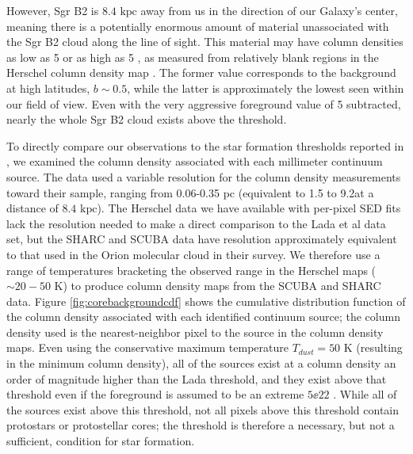 \documentclass[twocolumn]{aastex61}
\newcommand{\dsgrb}{\ensuremath{8.4\textrm{~kpc}}\xspace}
\begin{document}
However, Sgr B2 is \dsgrb away from us in the direction of our Galaxy's
center, meaning there is a potentially enormous amount of material unassociated
with the Sgr B2 cloud along the line of sight.  This material may have column
densities as low as
5 \persc or as high as 5 \persc, as measured from relatively
blank regions in the Herschel column density map \citep{Battersby2011a}.  The
former value corresponds to
the background at high latitudes, $b\sim0.5$, while the latter  is
approximately the lowest seen within our field of view. 
Even with the very aggressive foreground value of 5 \persc subtracted,
nearly the whole Sgr B2 cloud exists above the \citet{Lada2010a} threshold.

To directly compare our observations to the star formation thresholds reported
in \citet{Lada2010a}, we examined the column density associated with each
millimeter continuum source.  The \citet{Lada2010a} data used a variable
resolution for the column density measurements toward their sample, ranging from
0.06-0.35 pc (equivalent to 1.5 to 9.2\arcsec at a distance of \dsgrb).  The
Herschel data we have available with per-pixel SED fits lack the resolution
needed to make a direct comparison to the Lada et al data set, but the SHARC
and SCUBA data have resolution approximately equivalent to that used in the
Orion molecular cloud in their survey.  We therefore use a range of temperatures
bracketing the observed range in the Herschel maps ($\sim20-50$ K) to produce
column density maps from the SCUBA and SHARC data.  Figure
\ref{fig:corebackgroundcdf} shows the cumulative distribution function of the
column density associated with each identified continuum source; the column
density used is the nearest-neighbor pixel to the source in the column density
maps.  Even using the conservative maximum temperature $T_{dust}=50$ K
(resulting in the minimum column density), all of the sources exist at a column
density an order of magnitude higher than the Lada threshold, and they exist
above that threshold even if the foreground is assumed to be an extreme $5\ee{22}$
\persc.  While all of the sources exist above this threshold, not all pixels
above this threshold contain protostars or protostellar cores; the threshold
is therefore a necessary, but not a sufficient, condition for star formation.
\end{document}
